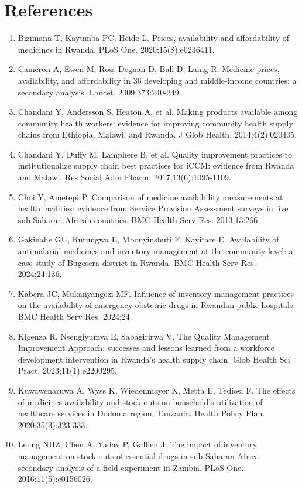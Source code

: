 \documentclass[10pt,a4paper]{article}
\begin{document}
\section{References}
\begin{enumerate}[leftmargin=1.5em]\small\item Bizimana T, Kayumba PC, Heide L. Prices, availability and affordability of medicines in Rwanda. PLoS One. 2020;15(8):e0236411.
\item Cameron A, Ewen M, Ross-Degnan D, Ball D, Laing R. Medicine prices, availability, and affordability in 36 developing and middle-income countries: a secondary analysis. Lancet. 2009;373:240-249.
\item Chandani Y, Andersson S, Heaton A, et al. Making products available among community health workers: evidence for improving community health supply chains from Ethiopia, Malawi, and Rwanda. J Glob Health. 2014;4(2):020405.
\item Chandani Y, Duffy M, Lamphere B, et al. Quality improvement practices to institutionalize supply chain best practices for iCCM: evidence from Rwanda and Malawi. Res Social Adm Pharm. 2017;13(6):1095-1109.
\item Choi Y, Ametepi P. Comparison of medicine availability measurements at health facilities: evidence from Service Provision Assessment surveys in five sub-Saharan African countries. BMC Health Serv Res. 2013;13:266.
\item Gakinahe GU, Rutungwa E, Mbonyinshuti F, Kayitare E. Availability of antimalarial medicines and inventory management at the community level: a case study of Bugesera district in Rwanda. BMC Health Serv Res. 2024;24:136.
\item Kabera JC, Mukanyangezi MF. Influence of inventory management practices on the availability of emergency obstetric drugs in Rwandan public hospitals. BMC Health Serv Res. 2024;24.
\item Kigenza R, Nsengiyumva E, Sabagirirwa V. The Quality Management Improvement Approach: successes and lessons learned from a workforce development intervention in Rwanda's health supply chain. Glob Health Sci Pract. 2023;11(1):e2200295.
\item Kuwawenaruwa A, Wyss K, Wiedenmayer K, Metta E, Tediosi F. The effects of medicines availability and stock-outs on household's utilization of healthcare services in Dodoma region, Tanzania. Health Policy Plan. 2020;35(3):323-333.
\item Leung NHZ, Chen A, Yadav P, Gallien J. The impact of inventory management on stock-outs of essential drugs in sub-Saharan Africa: secondary analysis of a field experiment in Zambia. PLoS One. 2016;11(5):e0156026.

\end{enumerate}
\end{document}
